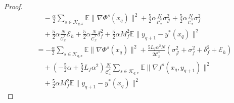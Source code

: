 \documentclass[lettersize,journal]{IEEEtran}
\begin{document}
\begin{proof}
\begin{align*}
&\quad -\frac{\alpha}{2}\sum_{s\in \mathcal{K}_{q,x}}\mathbb{E}\|\nabla \Phi^s(x_{q})\|^2+\frac{5}{2}\alpha \frac{N}{\mathcal{C}_x^*}\sigma_{\mathcal{J}}^2+\frac{5}{2}\alpha \frac{N}{\mathcal{C}_x^*}\sigma_f^2\\&\quad+\frac{5}{2}\alpha\frac{N}{\mathcal{C}_x^*}\mathcal{E}_h+\frac{5}{2}\alpha\frac{N}{\mathcal{C}_x^*}\delta^2_f+\frac{5}{2}\alpha M_f^2 \mathbb{E}\|y_{q+1}-y^*(x_q)\|^2\\ %
&=-\frac{\alpha}{2}\sum_{s\in \mathcal{K}_{q,x}}\mathbb{E}\|\nabla \Phi^s(x_{q})\|^2+\frac{5L_f\alpha^2 N}{2\mathcal{C}_x^*}(\sigma_{\mathcal{J}}^2+\sigma_f^2+\delta^2_f+\mathcal{E}_h)\\
&\quad+(-\frac{5}{2}\alpha+\frac{5}{2} L_f\alpha^2)\frac{N}{\mathcal{C}_x^*}\sum_{s\in \mathcal{K}_{q,x}}\mathbb{E}\|\nabla f^s(x_{q},y_{q+1})\|^2\\&\quad+\frac{5}{2}\alpha M_f^2\mathbb{E}\|y_{q+1}-y^*(x_q)\|^2
\end{align*}
\end{proof}
\end{document}
